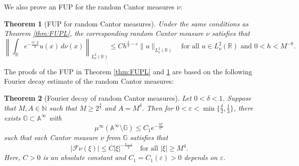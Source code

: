 \documentclass[12pt,reqno]{amsart}
\newcommand\Ab{\mathbb{A}}
\newcommand\Fc{\mathcal{F}}
\newcommand\Gb{\mathbb{G}}
\newcommand\N{\mathbb{N}}
\newcommand\R{\mathbb{R}}
\newcommand\ve{\varepsilon}
\theoremstyle{plain}
\newtheorem{thm}{\textbf{Theorem}}[section]
\theoremstyle{remark}
\numberwithin{equation}{section}
\begin{document}
We also prove an FUP for the random Cantor measures $\nu$:
\begin{thm}[FUP for random Cantor measures]\label{thm:FUPC}
Under the same conditions as Theorem \ref{thm:FUPL}, the corresponding random Cantor measure $\nu$ satisfies that
$$\left\|\int_{\R}e^{-\frac{ix\cdot \xi}{h}}u(x)\,d\nu(x)\right\|_{L^2_\nu(\R)}\le Ch^{\frac\delta4-\ve}\|u\|_{L^2_\nu(\R)}\quad\text{for all }u\in L^2_\nu(\R)\text{ and }0<h<M^{-8}.$$
\end{thm}

The proofs of the FUP in Theorem \ref{thm:FUPL} and \ref{thm:FUPC} are based on the following Fourier decay estimate of the random Cantor measures:
\begin{thm}[Fourier decay of random Cantor measures]\label{thm:FD}
Let $0<\delta<1$. Suppose that $M,A\in\N$ such that $M\ge 2^\frac4\delta$ and $A=M^\delta$. Then for $0<\ve<\min\{\frac\delta2,\frac13\}$, there exists $\Gb\subset\Ab^\infty$ with
$$\mu^\infty\left(\Ab^\infty\setminus\Gb\right)\le C_1e^{-\frac{M^\ve}{C}}$$
such that each Cantor measure $\nu$ from $\Gb$ satisfies that
\begin{equation}\label{eq:FD}
|\Fc\nu(\xi)|\le C|\xi|^{-\frac{\delta-\ve}{2}}\quad\text{for all }|\xi|\ge M^4.
\end{equation}
Here, $C>0$ is an absolute constant and $C_1=C_1(\ve)>0$ depends on $\ve$.
\end{thm}
\end{document}
